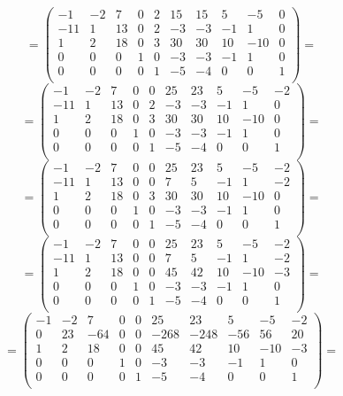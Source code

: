 \documentclass[a4paper,12pt]{article}
\begin{document}
\[
=
\begin{pmatrix}
-1 & -2 & 7 & 0 & 2 & 15 & 15 & 5 & -5 & 0 \\
-11 & 1 & 13 & 0 & 2 & -3 & -3 & -1 & 1 & 0  \\
1 & 2 & 18 & 0 & 3 & 30 & 30 & 10 & -10 & 0 \\
0 & 0 & 0 & 1 & 0 & -3 & -3 & -1 & 1 & 0  \\
0 & 0 & 0 & 0 & 1 & -5 & -4 & 0 & 0 & 1  \\
\end{pmatrix}
=
\]
\[
=
\begin{pmatrix}
-1 & -2 & 7 & 0 & 0 & 25 & 23 & 5 & -5 & -2  \\
-11 & 1 & 13 & 0 & 2 & -3 & -3 & -1 & 1 & 0  \\
1 & 2 & 18 & 0 & 3 & 30 & 30 & 10 & -10 & 0  \\
0 & 0 & 0 & 1 & 0 & -3 & -3 & -1 & 1 & 0  \\
0 & 0 & 0 & 0 & 1 & -5 & -4 & 0 & 0 & 1  \\
\end{pmatrix}
=
\]
\[
=
\begin{pmatrix}
-1 & -2 & 7 & 0 & 0 & 25 & 23 & 5 & -5 & -2 \\
-11 & 1 & 13 & 0 & 0 & 7 & 5 & -1 & 1 & -2 \\
1 & 2 & 18 & 0 & 3 & 30 & 30 & 10 & -10 & 0  \\
0 & 0 & 0 & 1 & 0 & -3 & -3 & -1 & 1 & 0 \\
0 & 0 & 0 & 0 & 1 & -5 & -4 & 0 & 0 & 1  \\
\end{pmatrix}
=
\]
\[
=
\begin{pmatrix}
-1 & -2 & 7 & 0 & 0 & 25 & 23 & 5 & -5 & -2 \\
-11 & 1 & 13 & 0 & 0 & 7 & 5 & -1 & 1 & -2  \\
1 & 2 & 18 & 0 & 0 & 45 & 42 & 10 & -10 & -3  \\
0 & 0 & 0 & 1 & 0 & -3 & -3 & -1 & 1 & 0  \\
0 & 0 & 0 & 0 & 1 & -5 & -4 & 0 & 0 & 1  \\
\end{pmatrix}
=
\]
\[
=
\begin{pmatrix}
-1 & -2 & 7 & 0 & 0 & 25 & 23 & 5 & -5 & -2 \\
0 & 23 & -64 & 0 & 0 & -268 & -248 & -56 & 56 & 20  \\
1 & 2 & 18 & 0 & 0 & 45 & 42 & 10 & -10 & -3 \\
0 & 0 & 0 & 1 & 0 & -3 & -3 & -1 & 1 & 0 \\
0 & 0 & 0 & 0 & 1 & -5 & -4 & 0 & 0 & 1 \\
\end{pmatrix}
=
\]
\end{document}
